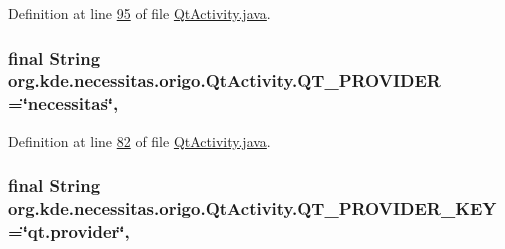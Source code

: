 Definition at line \hyperlink{_qt_activity_8java_source_l00095}{95} of file \hyperlink{_qt_activity_8java_source}{Qt\-Activity.\-java}.

\hypertarget{classorg_1_1kde_1_1necessitas_1_1origo_1_1_qt_activity_a36c31c743ff4a2b8c364a4872f684343}{
\subsubsection[{Q\-T\-\_\-\-P\-R\-O\-V\-I\-D\-E\-R}]{\setlength{\rightskip}{0pt plus 5cm}final String org.\-kde.\-necessitas.\-origo.\-Qt\-Activity.\-Q\-T\-\_\-\-P\-R\-O\-V\-I\-D\-E\-R =\char`\"{}necessitas\char`\"{}\hspace{0.3cm}{\ttfamily [static]}, {\ttfamily [private]}}}\label{db/d37/classorg_1_1kde_1_1necessitas_1_1origo_1_1_qt_activity_a36c31c743ff4a2b8c364a4872f684343}


Definition at line \hyperlink{_qt_activity_8java_source_l00082}{82} of file \hyperlink{_qt_activity_8java_source}{Qt\-Activity.\-java}.

\hypertarget{classorg_1_1kde_1_1necessitas_1_1origo_1_1_qt_activity_af7b23fdd694e3ec86e72ac81fdec1e6c}{
\subsubsection[{Q\-T\-\_\-\-P\-R\-O\-V\-I\-D\-E\-R\-\_\-\-K\-E\-Y}]{\setlength{\rightskip}{0pt plus 5cm}final String org.\-kde.\-necessitas.\-origo.\-Qt\-Activity.\-Q\-T\-\_\-\-P\-R\-O\-V\-I\-D\-E\-R\-\_\-\-K\-E\-Y =\char`\"{}qt.\-provider\char`\"{}\hspace{0.3cm}{\ttfamily [static]}, {\ttfamily [private]}}}\label{db/d37/classorg_1_1kde_1_1necessitas_1_1origo_1_1_qt_activity_af7b23fdd694e3ec86e72ac81fdec1e6c}


